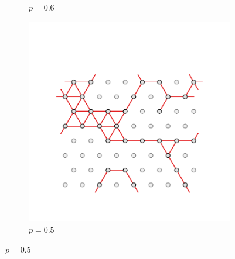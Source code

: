 \begin{figure}[bt]
\begin{subfigure}[b]{0.3\textwidth}
         \caption{$p=0.6$}
         \label{fig:perctri6}
     \end{subfigure}
     \hfill
      \begin{subfigure}[b]{0.3\textwidth}
         \centering
         \includegraphics[width=\textwidth]{./figures/targeted_opt/perc_tri_5.pdf}
         \caption{$p=0.5$}
         \label{fig:perctri5}
     \end{subfigure}
     \hfill
     

\end{figure}
